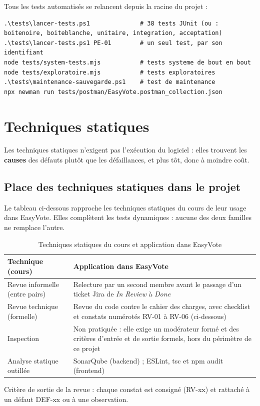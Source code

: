\documentclass[12pt,a4paper]{report}
\begin{document}
Tous les tests automatisés se relancent depuis la racine du projet :
\begin{lstlisting}
.\tests\lancer-tests.ps1              # 38 tests JUnit (ou : boitenoire, boiteblanche, unitaire, integration, acceptation)
.\tests\lancer-tests.ps1 PE-01        # un seul test, par son identifiant
node tests/system-tests.mjs           # tests systeme de bout en bout
node tests/exploratoire.mjs           # tests exploratoires
.\tests\maintenance-sauvegarde.ps1    # test de maintenance
npx newman run tests/postman/EasyVote.postman_collection.json
\end{lstlisting}

\section{Techniques statiques}

Les techniques statiques n'exigent pas l'exécution du logiciel : elles trouvent les \textbf{causes} des défauts plutôt que les défaillances, et plus tôt, donc à moindre coût.

\subsection{Place des techniques statiques dans le projet}\label{sec:statique-cours}
Le tableau ci-dessous rapproche les techniques statiques du cours de leur usage dans EasyVote. Elles complètent les tests dynamiques : aucune des deux familles ne remplace l'autre.
\begin{table}[H]
\centering
\caption{Techniques statiques du cours et application dans EasyVote}
\small
\begin{tabularx}{\textwidth}{@{}p{3.6cm}X@{}}
\toprule
\rowcolor{evlight}\textbf{Technique (cours)} & \textbf{Application dans EasyVote}\\
\midrule
Revue informelle (entre pairs) & Relecture par un second membre avant le passage d'un ticket Jira de \textit{In Review} à \textit{Done}\\
Revue technique (formelle) & Revue du code contre le cahier des charges, avec checklist et constats numérotés RV-01 à RV-06 (ci-dessous)\\
Inspection & Non pratiquée : elle exige un modérateur formé et des critères d'entrée et de sortie formels, hors du périmètre de ce projet\\
Analyse statique outillée & SonarQube (backend) ; ESLint, tsc et npm audit (frontend)\\
\bottomrule
\end{tabularx}
\end{table}
Critère de sortie de la revue : chaque constat est consigné (RV-xx) et rattaché à un défaut DEF-xx ou à une observation.
\end{document}
